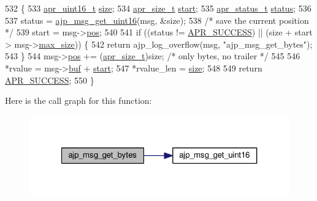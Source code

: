 \begin{DoxyCode}
532 \{
533     \hyperlink{group__apr__platform_ga3fb87c977e28a526d872d1081411b129}{apr\_uint16\_t} \hyperlink{group__APACHE__CORE__CONFIG_ga2bd3edb50f631a96f1b729fde236ff43}{size};
534     \hyperlink{group__apr__platform_gaaa72b2253f6f3032cefea5712a27540e}{apr\_size\_t}   \hyperlink{group__APACHE__CORE__DAEMON_ga6d3a995932cd00f6b3473898aa90d596}{start};
535     \hyperlink{group__apr__errno_gaa5105fa83cc322f09382292db8b47593}{apr\_status\_t} \hyperlink{group__APACHE__CORE__HTTPD_ga6e27f49150e9a14580fb313cc2777e00}{status};
536 
537     status = \hyperlink{group__AJP__api_gade25b6a051f93fb1d583d084318bf695}{ajp\_msg\_get\_uint16}(msg, &size);
538     \textcolor{comment}{/* save the current position */}
539     start = msg->\hyperlink{structajp__msg_af2b6552360c32f52f84383d538d3df00}{pos};
540 
541     \textcolor{keywordflow}{if} ((status != \hyperlink{group__apr__errno_ga9ee311b7bf1c691dc521d721339ee2a6}{APR\_SUCCESS}) || (size + start > msg->\hyperlink{structajp__msg_a70f7c841e5b344fc94175a0ebcd7f062}{max\_size})) \{
542         \textcolor{keywordflow}{return} ajp\_log\_overflow(msg, \textcolor{stringliteral}{"ajp\_msg\_get\_bytes"});
543     \}
544     msg->\hyperlink{structajp__msg_af2b6552360c32f52f84383d538d3df00}{pos} += (\hyperlink{group__apr__platform_gaaa72b2253f6f3032cefea5712a27540e}{apr\_size\_t})size;   \textcolor{comment}{/* only bytes, no trailer */}
545 
546     *rvalue     = msg->\hyperlink{structajp__msg_a7343b1803e9177dccb3c4716a5e12c3a}{buf} + \hyperlink{group__APACHE__CORE__DAEMON_ga6d3a995932cd00f6b3473898aa90d596}{start};
547     *rvalue\_len = \hyperlink{group__APACHE__CORE__CONFIG_ga2bd3edb50f631a96f1b729fde236ff43}{size};
548 
549     \textcolor{keywordflow}{return} \hyperlink{group__apr__errno_ga9ee311b7bf1c691dc521d721339ee2a6}{APR\_SUCCESS};
550 \}
\end{DoxyCode}


Here is the call graph for this function\+:
\nopagebreak
\begin{figure}[H]
\begin{center}
\leavevmode
\includegraphics[width=321pt]{group__AJP__api_ga45ea9a9d971a26248e9a8613e9c6a2e8_cgraph}
\end{center}
\end{figure}


